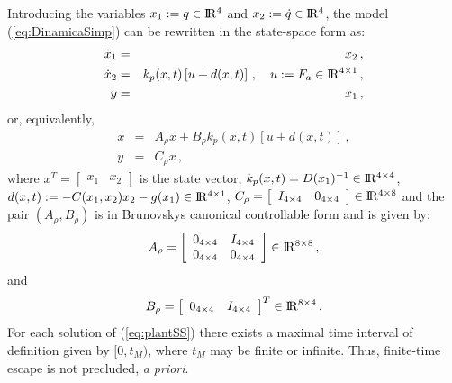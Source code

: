 \documentclass[letterpaper, 10 pt, journal, twocolumn]{IEEEtran}  %
\def\re{{\rm I}\! {\rm R}}
\theoremstyle{plain}
\theoremstyle{definition}
\theoremstyle{remark}
\begin{document}
Introducing the variables $x_1:=q \in \re^4$ and $x_2:=\dot{q}\in \re^4$, the model (\ref{eq:DinamicaSimp}) can be rewritten in the state-space form as:
%
\begin{eqnarray}
\dot{x}_1&=& x_2\,, \\
\dot{x}_2 &=& k_p(x,t) \left[u+d(x,t)\right]\,, \quad u:=F_a \in \re^{4 \times 1}\,,\\
y &=&  x_1\,,
\end{eqnarray}
%
or, equivalently, 
%
\begin{eqnarray}
\dot{x} &=& A_\rho x +  B_\rho k_p(x,t) [u + d(x,t)]\,, \label{eq:plantSS} \\
y &=& C_\rho x\,,\label{eq:plantSaida} 
\end{eqnarray}
%
where $x^T= \left [ \begin{array}{cc} x_1 & x_2\end{array} \right ]$ is the state vector, $k_p(x,t)=D(x_1)^{-1} \in \re^{4 \times 4}$, $d(x,t):=-C(x_1,x_2) x_2-g(x_1) \in \re^{4 \times 1}$, $C_\rho=\left[\begin{array}{cc} I_{4 \times 4} & 0_{4 \times 4}\end{array} \right] \in \re^{4 \times 8}$ and the pair $(A_\rho, B_\rho)$ is in Brunovskys canonical controllable form and is given by:
%
$$A_\rho=\left[\begin{array}{cccc} 0_{4 \times 4} & I_{4 \times 4}\\
0_{4 \times 4} & 0_{4 \times 4}\end{array} \right] \in \re^{8 \times 8}\,,$$
%
and
%
$$B_\rho=\left[\begin{array}{cc}  0_{4 \times 4} & I_{4 \times 4} \end{array} \right]^T \in \re^{8 \times 4}\,.$$
%
For each solution of (\ref{eq:plantSS}) there exists a maximal
time interval of definition given by $[0,t_M)$, where $t_M$ may be
finite or infinite. Thus, finite-time escape is not precluded, {\em
a priori}.

\medskip
\end{document}

